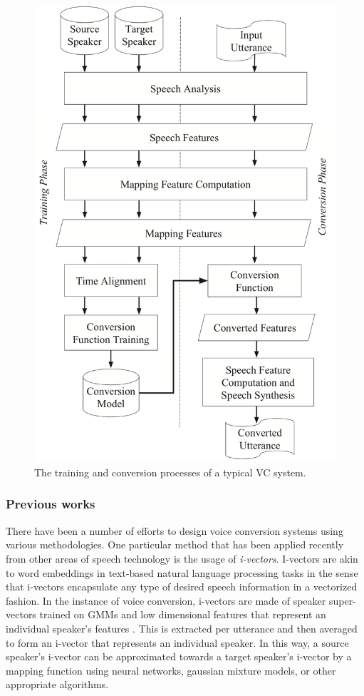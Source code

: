 \documentclass
[
    a4paper,
    twoside,
    12pt
]
{report}
\begin{document}
\begin{figure}[H]
\centering
\includegraphics[scale=0.25]{img/vc-flowchart.png}
\caption{The training and conversion processes of a typical VC system.}
\label{fig:vc-flowchart}
\end{figure}

\subsubsection*{Previous works}

There have been a number of efforts to design voice conversion systems
using various methodologies. One particular method that has been applied
recently from other areas of speech technology is the usage of
\emph{i-vectors}. I-vectors are akin to word embeddings in text-based
natural language processing tasks in the sense that i-vectors
encapsulate any type of desired speech information in a vectorized
fashion. In the instance of voice conversion, i-vectors are made of
speaker super-vectors trained on GMMs and low dimensional features that
represent an individual speaker's features \parencite{wu2016}. This is
extracted per utterance and then averaged to form an i-vector that
represents an individual speaker. In this way, a source speaker's
i-vector can be approximated towards a target speaker's i-vector by a
mapping function using neural networks, gaussian mixture models, or
other appropriate algorithms.
\end{document}
